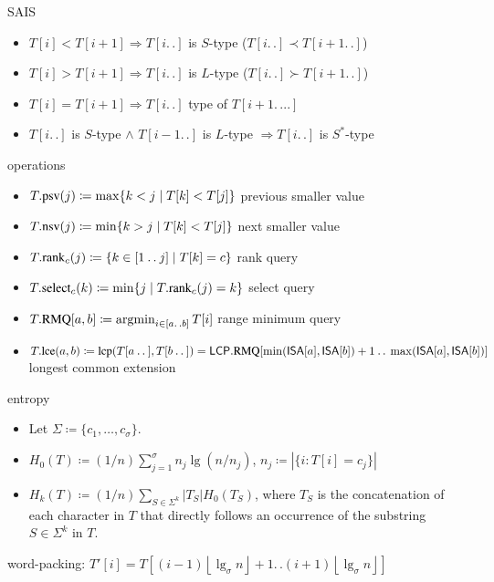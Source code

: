 \documentclass[10pt,landscape]{article}
\newcommand*{\IC}{\mathbin{{.}\,{.}}} %
\newcommand*{\gauss}[1]{\left\lfloor#1\right\rfloor} %
\newcommand*{\abs}[1]{\ensuremath{|#1|}} %
\newcommand*{\menge}[1]{\ensuremath{\{#1\}}} %
\newcommand*{\instancename}[1]{\ensuremath{\mathsf{#1}}} %
\newcommand*{\LCPA} {\instancename{LCP}}
\newcommand*{\ISA} {\instancename{ISA}}
\newcommand*{\textT}  {\ensuremath{T}}
\newcommand*{\textS}  {\ensuremath{S}}
\newcommand*{\functionname}[1]{{\ensuremath{\renewcommand{\rmdefault}{ptm}\fontfamily{ppl}\selectfont\textrm{\textup{#1}}}}} %
\newcommand*{\select}{\functionname{select}}
\newcommand*{\rank}{\functionname{rank}}
\newcommand*{\RMQ}{\functionname{RMQ}}
\newcommand*{\lcp}{\functionname{lcp}}
\newcommand*{\lce}{\functionname{lce}}
\newcommand*{\psv}{\functionname{psv}}
\newcommand*{\nsv}{\functionname{nsv}}
\newcommand*{\argmin}{\operatorname{argmin}}
\begin{document}
\begin{multicols}{2}
SAIS
	\begin{itemize}
	   \item $\textT[i] < \textT[i+1] \Rightarrow \textT[i\IC{}]$ is $S$-type ($\textT[i\IC{}] \prec \textT[i+1\IC{}]$)
	   \item $\textT[i] > \textT[i+1] \Rightarrow \textT[i\IC{}]$ is $L$-type ($\textT[i\IC{}] \succ \textT[i+1\IC{}]$)
	   \item $\textT[i] = \textT[i+1] \Rightarrow \textT[i\IC{}]$ type of $\textT[i+1\IC{}..]$
	   \item $\textT[i\IC{}]$ is $S$-type $\wedge$ $\textT[i-1\IC{}]$ is $L$-type $\Rightarrow \textT[i\IC{}]$ is $S^*$-type
	\end{itemize}

operations
	\begin{itemize}
	   \item $\textT.\psv(j) \coloneqq \max \{ k < j \mid \textT[k] < \textT[j] \}$ previous smaller value
	   \item $\textT.\nsv(j) \coloneqq \min \{ k > j \mid \textT[k] < \textT[j] \}$ next smaller value
	   \item $\textT.\rank_c(j) \coloneqq \menge{ k \in [1\IC{}j] \mid \textT[k] = c }$ rank query
	   \item $\textT.\select_c(k) \coloneqq \min \menge{j \mid \textT.\rank_c(j) = k}$ select query
	   \item $\textT.\RMQ[a,b] \coloneqq \argmin_{i \in [a\IC{}b]} T[i]$ range minimum query
	   \item $\textT.\lce(a,b) \coloneqq \lcp(T[a\IC{}],T[b\IC{}]) = \LCPA.\RMQ[\min(\ISA[a],\ISA[b])+1\IC{}\max(\ISA[a],\ISA[b])]$ longest common extension
	\end{itemize}


entropy 
\begin{itemize}
\item Let $\Sigma \coloneqq \menge{c_1, \ldots, c_\sigma}$.
	\item    $H_0(\textT) \coloneqq (1/n)\sum_{j=1}^{\sigma} n_j \lg(n/n_j)$, $n_j \coloneqq \abs{\menge{i : \textT[i] = c_j}}$
	\item    $H_k(\textT) \coloneqq (1/n) \sum_{\textS \in \Sigma^k} \abs{\textT_{\textS}} H_0(\textT_{\textS})$,
where $\textT_{\textS}$ is the concatenation of each character in $\textT$ that directly follows an occurrence of the substring~$\textS \in \Sigma^k$ in $\textT$.
\end{itemize}



word-packing: $T'[i] = T[(i-1) \gauss{\lg_\sigma n}+1 \IC{} (i+1) \gauss{\lg_\sigma n}]$


\end{multicols}
\end{document}
